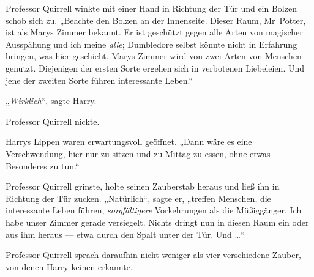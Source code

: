 Professor Quirrell winkte mit einer Hand in Richtung der Tür und ein Bolzen schob sich zu.
„Beachte den Bolzen an der Innenseite. Dieser Raum, Mr~Potter, ist als Marys Zimmer bekannt. Er ist geschützt gegen alle Arten von magischer Ausspähung und ich meine \emph{alle}; Dumbledore selbst könnte nicht in Erfahrung bringen, was hier geschieht. Marys Zimmer wird von zwei Arten von Menschen genutzt. Diejenigen der ersten Sorte ergehen sich in verbotenen Liebeleien. Und jene der zweiten Sorte führen interessante Leben.“

„\emph{Wirklich}“, sagte Harry.

Professor Quirrell nickte.

Harrys Lippen waren erwartungsvoll geöffnet.
„Dann wäre es eine Verschwendung, hier nur zu sitzen und zu Mittag zu essen, ohne etwas Besonderes zu tun.“

Professor Quirrell grinste, holte seinen Zauberstab heraus und ließ ihn in Richtung der Tür zucken.
„Natürlich“, sagte er, „treffen Menschen, die interessante Leben führen, \emph{sorgfältigere} Vorkehrungen als die Müßiggänger. Ich habe unser Zimmer gerade versiegelt. Nichts dringt nun in diesen Raum ein oder aus ihm heraus — etwa durch den Spalt unter der Tür. Und …“

Professor Quirrell sprach daraufhin nicht weniger als vier verschiedene Zauber, von denen Harry keinen erkannte.

